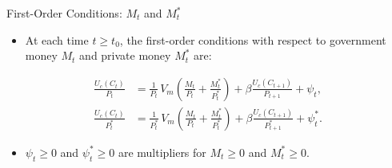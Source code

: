 \documentclass[11pt,aspectratio=169]{beamer}
\begin{document}
\begin{frame}{First-Order Conditions: $M_t$ and $M_t^\ast$}
\small
\begin{itemize}
    \item At each time $t\ge t_0$, the first-order conditions with respect to government money $M_t$ and private money $M_t^\ast$ are:
\end{itemize}

\vspace{0.3em}

\begin{align}
\frac{U_c(C_t)}{P_t}
&=
\frac{1}{P_t}\,
V_m\!\left(\frac{M_t}{P_t}+\frac{M_t^{\ast}}{P_t^{\ast}}\right)
+\beta \frac{U_c(C_{t+1})}{P_{t+1}}
+\psi_t,
\label{Euler22}
\\[0.7em]
\frac{U_c(C_t)}{P_t^{\ast}}
&=
\frac{1}{P_t^{\ast}}\,
V_m\!\left(\frac{M_t}{P_t}+\frac{M_t^{\ast}}{P_t^{\ast}}\right)
+\beta \frac{U_c(C_{t+1})}{P_{t+1}^{\ast}}
+\psi_t^{\ast}.
\label{Euler2}
\end{align}

\vspace{0.3em}

\begin{itemize}
    \item $\psi_t\ge 0$ and $\psi_t^\ast\ge 0$ are multipliers for $M_t\ge 0$ and $M_t^\ast\ge 0$.
\end{itemize}

\end{frame}
\end{document}
